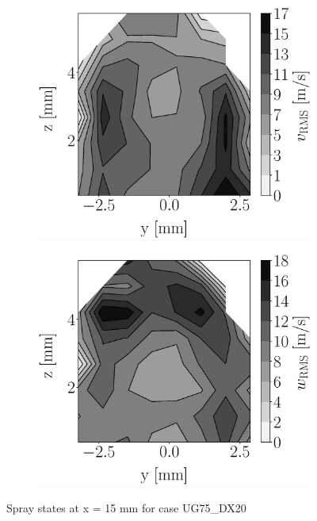 \begin{figure}[h!]
\begin{subfigure}[b]{0.22\textwidth}
\end{subfigure}
   \hspace{0.17in}
\begin{subfigure}[b]{0.22\textwidth}
	\centering
   \includegraphics[scale=0.17]{./part2_developments/figures_ch5_resolved_JICF/injectors_SLI/uG75_dx20_x15_uy_rms_map.eps}
\end{subfigure}
   \hspace{0.17in}
\begin{subfigure}[b]{0.22\textwidth}
	\centering
   \includegraphics[scale=0.17]{./part2_developments/figures_ch5_resolved_JICF/injectors_SLI/uG75_dx20_x15_uz_rms_map.eps}
\end{subfigure}
\caption{Spray states at x = 15 mm for case UG75\_DX20}
\label{fig:injectors_sli_uG75_dx20_x15}
\end{figure}


